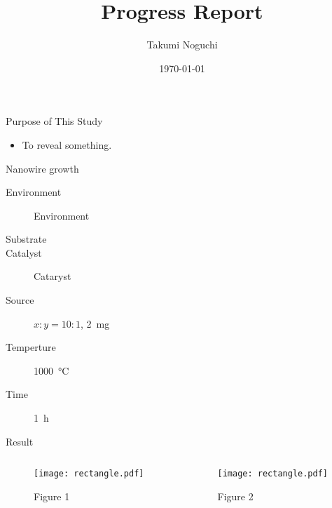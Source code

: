 \documentclass[12pt]{beamer}
\title{Progress Report}
\author{Takumi Noguchi}
\institute[kut]{Graduate School of Engineering, Kochi University of Technology, Kohno Lab.}
\date{\today}
\begin{document}
\begin{frame}
  \titlepage
\end{frame}

\begin{frame}{Purpose of This Study}
  \begin{itemize}
    \item To reveal something.
  \end{itemize}
\end{frame}

\begin{frame}{Nanowire growth}
  

  \begin{description}
    \item[Environment] Environment
    \item[Substrate] 
    \item[Catalyst] Cataryst
    \item[Source] $x : y = 10: 1$, \SI{2}{mg}
    \item[Temperture] \SI{1000}{\degreeCelsius}
    \item[Time] \SI{1}{\hour}
  \end{description}

\end{frame}


\begin{frame}{Result}
  \begin{columns}[t]
    \begin{column}{.45\linewidth}
      \begin{figure}
        \centering
        \texttt{[image: rectangle.pdf]}
        \caption{Figure 1}
      \end{figure}
    \end{column}
    \begin{column}{.45\linewidth}
      \begin{figure}
        \centering
        \texttt{[image: rectangle.pdf]}
        \caption{Figure 2}
      \end{figure}
    \end{column}
  \end{columns}
\end{frame}
\end{document}
